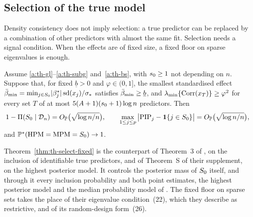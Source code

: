 \subsection{Selection of the true model}\label{sec:theory-selection}

Density consistency does not imply selection: a true predictor can be replaced by a combination of other predictors
with almost the same fit. Selection needs a signal condition. When the effects are of fixed size, a fixed floor on
sparse eigenvalues is enough.

\begin{theorem}\label{thm:th-select-fixed}
Assume \ref{a:th-gl}--\ref{a:th-subg} and~\ref{a:th-bs}, with $s_0\ge1$ not depending on $n$. Suppose that, for
fixed $\underline b>0$ and $\varphi\in(0,1]$, the smallest standardised effect
$\bar\beta_{\min}=\min_{j\in S_0}\lvert \beta^*_j\rvert\operatorname{sd}(x_j)/\sigma_*$ satisfies $\bar\beta_{\min}\ge\underline b$, and $\lambda_{\min}\{\operatorname{Corr}(x_T)\}\ge\varphi^2$ for every set $T$ of at most
$5(A+1)(s_0+1)\log n$ predictors. Then
\[
  1-\Pi(S_0\mid\mathcal D_n)=O_{\mathbb{P}}\big(\sqrt{\log n/n}\big),\qquad
  \max_{1\le j\le p}\big\lvert\mathrm{PIP}_j-\mathbf{1}\{j\in S_0\}\big\rvert=O_{\mathbb{P}}\big(\sqrt{\log n/n}\big),
\]
and $\mathbb{P}^*(\mathrm{HPM}=\mathrm{MPM}=S_0)\to1$.
\end{theorem}

Theorem~\ref{thm:th-select-fixed} is the counterpart of Theorem~3 of \citet{SongLiang2015}, on the inclusion of
identifiable true predictors, and of Theorem~S of their supplement, on the highest posterior model. It controls the
posterior mass of $S_0$ itself, and through it every inclusion probability and both point estimates, the highest
posterior model and the median probability model of \citet{BarbieriBerger2004}. The fixed floor on sparse sets takes
the place of their eigenvalue condition~(22), which they describe as restrictive, and of its random-design
form~(26).

